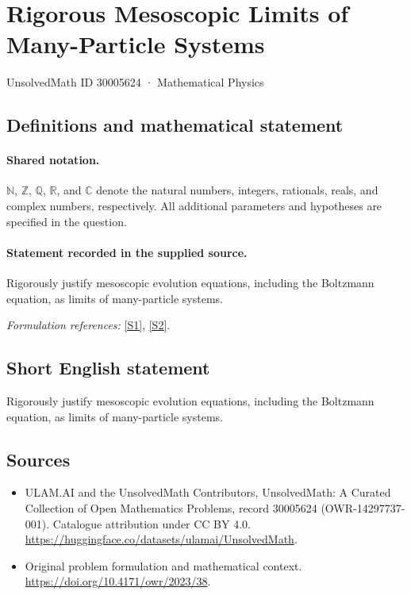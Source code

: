 \documentclass[11pt]{article}
\newcommand{\sref}[2]{\hyperlink{source:#1:#2}{[S#2]}}
\begin{document}
\setcounter{section}{30005623}
\section{Rigorous Mesoscopic Limits of Many-Particle Systems}\label{30005624}
{\small UnsolvedMath ID 30005624 · Mathematical Physics}
\subsection{Definitions and mathematical statement}

\paragraph{Shared notation.}$\mathbb N$, $\mathbb Z$, $\mathbb Q$, $\mathbb R$, and $\mathbb C$ denote the natural numbers, integers, rationals, reals, and complex numbers, respectively. All additional parameters and hypotheses are specified in the question.


\paragraph{Statement recorded in the supplied source.}
Rigorously justify mesoscopic evolution equations, including the Boltzmann equation, as limits of many-particle systems.
\par\smallskip\textit{Formulation references:} \sref{30005624}{1}, \sref{30005624}{2}.
\subsection{Short English statement}
Rigorously justify mesoscopic evolution equations, including the Boltzmann equation, as limits of many-particle systems.
\subsection{Sources}
\begin{itemize}
\item[\hypertarget{source:30005624:1}{S1}] ULAM.AI and the UnsolvedMath Contributors, UnsolvedMath: A Curated Collection of Open Mathematics Problems, record 30005624 (OWR-14297737-001). Catalogue attribution under CC BY 4.0.
\url{https://huggingface.co/datasets/ulamai/UnsolvedMath}.
\item[\hypertarget{source:30005624:2}{S2}] Original problem formulation and mathematical context.
\url{https://doi.org/10.4171/owr/2023/38}.
\end{itemize}
\label{end:30005624}
\end{document}

